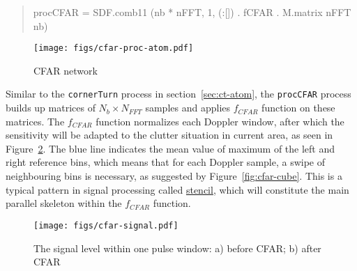 \documentclass[
  a4paper,
]{article}
\newenvironment{Shaded}{}{}
\newcommand{\DecValTok}[1]{\textcolor[rgb]{0.25,0.63,0.44}{#1}}
\newcommand{\FunctionTok}[1]{\textcolor[rgb]{0.02,0.16,0.49}{#1}}
\newcommand{\NormalTok}[1]{#1}
\begin{document}
\begin{quote}
\begin{Shaded}
\begin{Highlighting}[numbers=left,,firstnumber=393,]
\NormalTok{procCFAR }\FunctionTok{=}\NormalTok{ SDF.comb11 (nb }\FunctionTok{*}\NormalTok{ nFFT, }\DecValTok{1}\NormalTok{, (}\FunctionTok{:}\NormalTok{[]) }\FunctionTok{.}\NormalTok{ fCFAR }\FunctionTok{.}\NormalTok{ M.matrix nFFT nb)}
\end{Highlighting}
\end{Shaded}
\end{quote}

\begin{figure}
\hypertarget{fig:cfar-net-atom}{%
\centering
\texttt{[image: figs/cfar-proc-atom.pdf]}
\caption{CFAR network}\label{fig:cfar-net-atom}
}
\end{figure}

Similar to the \texttt{cornerTurn} process in section~\ref{sec:ct-atom},
the \texttt{procCFAR} process builds up matrices of
\(N_b\times N_{FFT}\) samples and applies \(f_{CFAR}\) function on these
matrices. The \(f_{CFAR}\) function normalizes each Doppler window,
after which the sensitivity will be adapted to the clutter situation in
current area, as seen in Figure~\ref{fig:cfar-signal}. The blue line
indicates the mean value of maximum of the left and right reference
bins, which means that for each Doppler sample, a swipe of neighbouring
bins is necessary, as suggested by Figure~\ref{fig:cfar-cube}. This is a
typical pattern in signal processing called
\href{https://en.wikipedia.org/wiki/Stencil_code}{stencil}, which will
constitute the main parallel skeleton within the \(f_{CFAR}\) function.

\begin{figure}
\hypertarget{fig:cfar-signal}{%
\centering
\texttt{[image: figs/cfar-signal.pdf]}
\caption{The signal level within one pulse window: a) before CFAR; b)
after CFAR}\label{fig:cfar-signal}
}
\end{figure}
\end{document}
